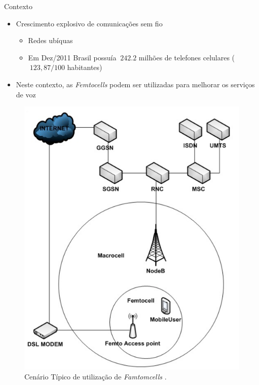 \begin{frame}
  \begin{block}{Contexto}
    \begin{itemize}
      \item Crescimento explosivo de comunicações sem fio
      \begin{itemize}
        \item Redes ubíquas
        \item Em Dez/2011 Brasil possuía $~242.2$ milhões de telefones
        celulares ($~123,87/100$ habitantes)
      \end{itemize}
      \item Neste contexto, as \textit{\alert{Femtocells}} podem ser utilizadas
      para melhorar os serviços de voz %
    \end{itemize}
  \end{block}
  \begin{figure}[h]
  	\begin{center}
      \includegraphics [scale=0.18]{./Figures/FemtocellTopology}
      \caption {Cenário Típico de utilização de \textit{Famtomcells}
      \cite{green-markov}.}
  		\label{fig:FemtocellTopology}
  	\end{center}
  \end{figure}
\end{frame}

